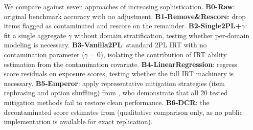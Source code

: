 We compare against seven approaches of increasing sophistication. \textbf{B0-Raw}: original benchmark accuracy with no adjustment. \textbf{B1-Remove\&Rescore}: drop items flagged as contaminated and rescore on the remainder. \textbf{B2-Single2PL+$\gamma$}: fit a single aggregate $\gamma$ without domain stratification, testing whether per-domain modeling is necessary. \textbf{B3-Vanilla2PL}: standard 2PL IRT with no contamination parameter ($\gamma=0$), isolating the contribution of IRT ability estimation from the contamination covariate. \textbf{B4-LinearRegression}: regress score residuals on exposure scores, testing whether the full IRT machinery is necessary. \textbf{B5-Emperor}: apply representative mitigation strategies (item rephrasing and option shuffling) from \citet{sun2025emperor}, who demonstrate that all 20 tested mitigation methods fail to restore clean performance. \textbf{B6-DCR}: the decontaminated score estimates from \citet{xu2025dcr} (qualitative comparison only, as no public implementation is available for exact replication).
